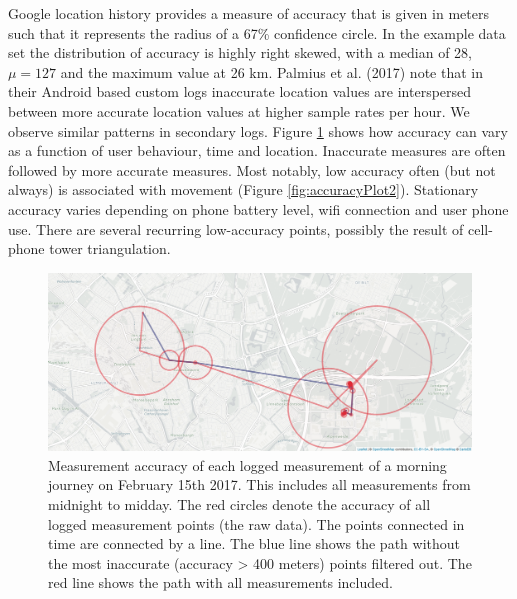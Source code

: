 \documentclass[english,man]{apa6}
\theoremstyle{definition}
\theoremstyle{definition}
\theoremstyle{definition}
\theoremstyle{remark}
\begin{document}
Google location history provides a measure of accuracy that is given in
meters such that it represents the radius of a 67\% confidence circle.
In the example data set the distribution of accuracy is highly right
skewed, with a median of 28, \(\mu = 127\) and the maximum value at 26
km. Palmius et al. (2017) note that in their Android based custom logs
inaccurate location values are interspersed between more accurate
location values at higher sample rates per hour. We observe similar
patterns in secondary logs. Figure \ref{fig:accuracyPlot} shows how
accuracy can vary as a function of user behaviour, time and location.
Inaccurate measures are often followed by more accurate measures. Most
notably, low accuracy often (but not always) is associated with movement
(Figure \ref{fig:accuracyPlot2}). Stationary accuracy varies depending
on phone battery level, wifi connection and user phone use. There are
several recurring low-accuracy points, possibly the result of cell-phone
tower triangulation.

\begin{figure}
\includegraphics[width=1\linewidth]{img/journeyTillMiddayBoaz} \caption{Measurement accuracy of each logged measurement of a morning journey on February 15th 2017. This includes all measurements from midnight to midday. The red circles denote the accuracy of all logged measurement points (the raw data). The points connected in time are connected by a line. The blue line shows the path without the most inaccurate (accuracy > 400 meters) points filtered out. The red line shows the path with all measurements included. }\label{fig:accuracyPlot}
\end{figure}
\end{document}
